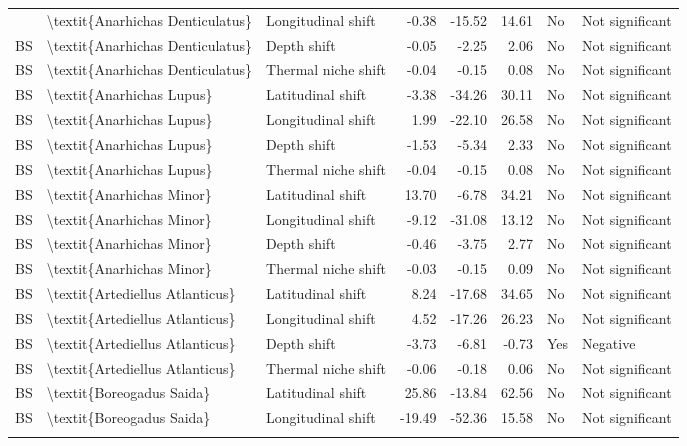 \begin{longtable}[t]{lllrrrll}
{{BS & \textbackslash{}textit\{Anarhichas Denticulatus\} & Longitudinal shift & -0.38 & -15.52 & 14.61 & No & Not significant\\
BS & \textbackslash{}textit\{Anarhichas Denticulatus\} & Depth shift & -0.05 & -2.25 & 2.06 & No & Not significant\\
\addlinespace
BS & \textbackslash{}textit\{Anarhichas Denticulatus\} & Thermal niche shift & -0.04 & -0.15 & 0.08 & No & Not significant\\
BS & \textbackslash{}textit\{Anarhichas Lupus\} & Latitudinal shift & -3.38 & -34.26 & 30.11 & No & Not significant\\
BS & \textbackslash{}textit\{Anarhichas Lupus\} & Longitudinal shift & 1.99 & -22.10 & 26.58 & No & Not significant\\
BS & \textbackslash{}textit\{Anarhichas Lupus\} & Depth shift & -1.53 & -5.34 & 2.33 & No & Not significant\\
BS & \textbackslash{}textit\{Anarhichas Lupus\} & Thermal niche shift & -0.04 & -0.15 & 0.08 & No & Not significant\\
\addlinespace
BS & \textbackslash{}textit\{Anarhichas Minor\} & Latitudinal shift & 13.70 & -6.78 & 34.21 & No & Not significant\\
BS & \textbackslash{}textit\{Anarhichas Minor\} & Longitudinal shift & -9.12 & -31.08 & 13.12 & No & Not significant\\
BS & \textbackslash{}textit\{Anarhichas Minor\} & Depth shift & -0.46 & -3.75 & 2.77 & No & Not significant\\
BS & \textbackslash{}textit\{Anarhichas Minor\} & Thermal niche shift & -0.03 & -0.15 & 0.09 & No & Not significant\\
BS & \textbackslash{}textit\{Artediellus Atlanticus\} & Latitudinal shift & 8.24 & -17.68 & 34.65 & No & Not significant\\
\addlinespace
BS & \textbackslash{}textit\{Artediellus Atlanticus\} & Longitudinal shift & 4.52 & -17.26 & 26.23 & No & Not significant\\
BS & \textbackslash{}textit\{Artediellus Atlanticus\} & Depth shift & -3.73 & -6.81 & -0.73 & Yes & Negative\\
BS & \textbackslash{}textit\{Artediellus Atlanticus\} & Thermal niche shift & -0.06 & -0.18 & 0.06 & No & Not significant\\
BS & \textbackslash{}textit\{Boreogadus Saida\} & Latitudinal shift & 25.86 & -13.84 & 62.56 & No & Not significant\\
BS & \textbackslash{}textit\{Boreogadus Saida\} & Longitudinal shift & -19.49 & -52.36 & 15.58 & No & Not significant\\
}}
\end{longtable}
